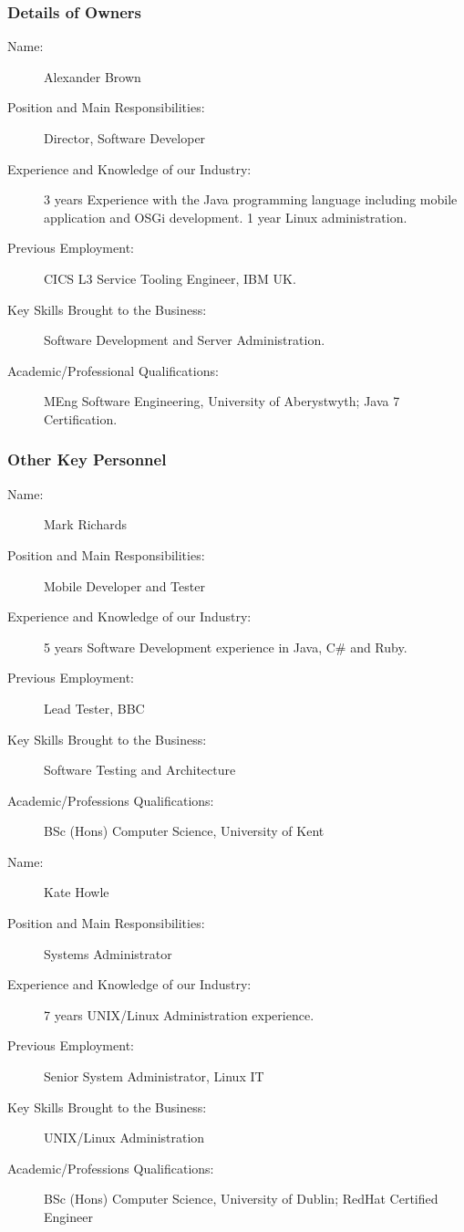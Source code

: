 \documentclass[DIV=calc, paper=a4, fontsize=11pt]{scrartcl}	 %
\begin{document}
\subsubsection*{Details of Owners}
\begin{description}
\item[Name:] Alexander Brown
\item[Position and Main Responsibilities:] Director, Software Developer
\item[Experience and Knowledge of our Industry:] 3 years Experience with the Java programming 
language including mobile application and OSGi development. 1 year Linux administration. %
\item[Previous Employment:] CICS L3 Service Tooling Engineer, IBM UK.
\item[Key Skills Brought to the Business:] Software Development and Server Administration.
\item[Academic/Professional Qualifications:] MEng Software Engineering, University of Aberystwyth; 
Java 7 Certification.
\end{description}

\subsubsection*{Other Key Personnel}
\begin{description}
\item[Name:] Mark Richards
\item[Position and Main Responsibilities:] Mobile Developer and Tester
\item[Experience and Knowledge of our Industry:] 5 years Software Development experience in Java, 
C\# and Ruby.
\item[Previous Employment:] Lead Tester, BBC
\item[Key Skills Brought to the Business:] Software Testing and Architecture
\item[Academic/Professions Qualifications:] BSc (Hons) Computer Science, University of Kent
\end{description}

\begin{description}
\item[Name:] Kate Howle
\item[Position and Main Responsibilities:] Systems Administrator
\item[Experience and Knowledge of our Industry:] 7 years UNIX/Linux Administration experience.
\item[Previous Employment:] Senior System Administrator, Linux IT
\item[Key Skills Brought to the Business:] UNIX/Linux Administration
\item[Academic/Professions Qualifications:] BSc (Hons) Computer Science, University of Dublin; 
RedHat Certified Engineer
\end{description}
\end{document}
